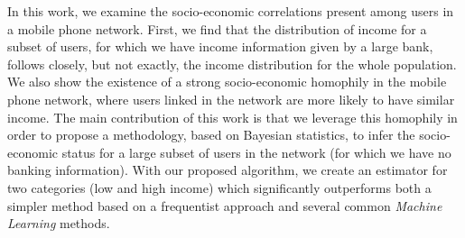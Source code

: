 In this work, we examine the socio-economic correlations present among users in a mobile phone network. First, we find that the distribution of income for a subset of users, for which we have income information given by a large bank, follows closely, but not exactly, the income distribution for the whole population. We also show the existence of a strong socio-economic homophily in the mobile phone network, where users linked in the network are more likely to have similar income. The main contribution of this work is that we leverage this homophily in order to propose a methodology, based on Bayesian statistics, to infer the socio-economic status for a large subset of users in the network (for which we have no banking information). With our proposed algorithm, we create an estimator for two categories (low and high income) which significantly outperforms both a simpler method based on a frequentist approach and several common \emph{Machine Learning} methods.
